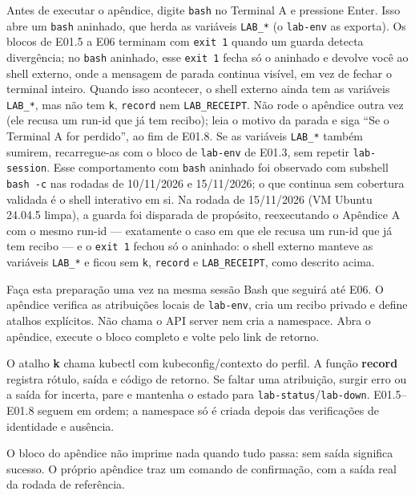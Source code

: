 \documentclass[12pt,openany,oneside,a4paper,chapter=TITLE,english,brazil]{abntex2}
\begin{document}
Antes de executar o apêndice, digite \texttt{bash} no Terminal A e pressione Enter. Isso abre um \texttt{bash} aninhado, que herda as variáveis \texttt{LAB\_\allowbreak{}*} (o \texttt{lab-{}\allowbreak{}env} as exporta). Os blocos de E01.5 a E06 terminam com \texttt{exit 1} quando um guarda detecta divergência; no \texttt{bash} aninhado, esse \texttt{exit 1} fecha só o aninhado e devolve você ao shell externo, onde a mensagem de parada continua visível, em vez de fechar o terminal inteiro. Quando isso acontecer, o shell externo ainda tem as variáveis \texttt{LAB\_\allowbreak{}*}, mas não tem \texttt{k}, \texttt{record} nem \texttt{LAB\_\allowbreak{}RECEIPT}. Não rode o apêndice outra vez (ele recusa um run-id que já tem recibo); leia o motivo da parada e siga ``Se o Terminal A for perdido'', ao fim de E01.8. Se as variáveis \texttt{LAB\_\allowbreak{}*} também sumirem, recarregue-as com o bloco de \texttt{lab-{}\allowbreak{}env} de E01.3, sem repetir \texttt{lab-{}\allowbreak{}session}. Esse comportamento com \texttt{bash} aninhado foi observado com subshell \texttt{bash -{}\allowbreak{}c} nas rodadas de 10/11/2026 e 15/11/2026; o que continua sem cobertura validada é o shell interativo em si. Na rodada de 15/11/2026 (VM Ubuntu 24.04.5 limpa), a guarda foi disparada de propósito, reexecutando o Apêndice A com o mesmo run-id --- exatamente o caso em que ele recusa um run-id que já tem recibo --- e o \texttt{exit 1} fechou só o aninhado: o shell externo manteve as variáveis \texttt{LAB\_\allowbreak{}*} e ficou sem \texttt{k}, \texttt{record} e \texttt{LAB\_\allowbreak{}RECEIPT}, como descrito acima.

Faça esta preparação uma vez na mesma sessão Bash que seguirá até E06. O apêndice verifica as atribuições locais de \texttt{lab-{}\allowbreak{}env}, cria um recibo privado e define atalhos explícitos. Não chama o API server nem cria a namespace. Abra o apêndice, execute o bloco completo e volte pelo link de retorno.

O atalho \textbf{k} chama kubectl com kubeconfig/contexto do perfil. A função \textbf{record} registra rótulo, saída e código de retorno. Se faltar uma atribuição, surgir erro ou a saída for incerta, pare e mantenha o estado para \texttt{lab-{}\allowbreak{}status}/\texttt{lab-{}\allowbreak{}down}. E01.5--E01.8 seguem em ordem; a namespace só é criada depois das verificações de identidade e ausência.

O bloco do apêndice não imprime nada quando tudo passa: sem saída significa sucesso. O próprio apêndice traz um comando de confirmação, com a saída real da rodada de referência.
\end{document}
